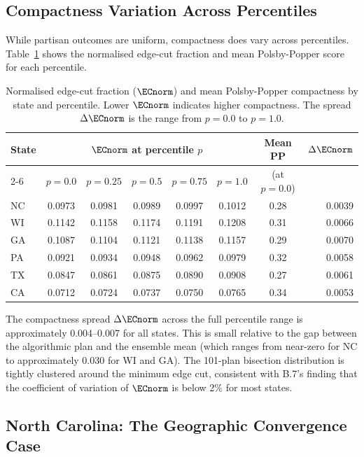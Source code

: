 \subsection{Compactness Variation Across Percentiles}

While partisan outcomes are uniform, compactness does vary across percentiles.
Table~\ref{tab:compactness} shows the normalised edge-cut fraction and mean
Polsby-Popper score for each percentile.

\begin{table}[htbp]
\centering
\caption{Normalised edge-cut fraction ($\ECnorm$) and mean Polsby-Popper
compactness by state and percentile. Lower $\ECnorm$ indicates higher
compactness. The spread $\Delta\ECnorm$ is the range from $p=0.0$ to $p=1.0$.}
\label{tab:compactness}
\begin{tabular}{lccccccr}
\toprule
\textbf{State} & \multicolumn{5}{c}{$\ECnorm$ at percentile $p$} & \textbf{Mean PP} & $\Delta\ECnorm$ \\
\cmidrule(lr){2-6}
 & $p{=}0.0$ & $p{=}0.25$ & $p{=}0.5$ & $p{=}0.75$ & $p{=}1.0$ & (at $p{=}0.0$) & \\
\midrule
NC & 0.0973 & 0.0981 & 0.0989 & 0.0997 & 0.1012 & 0.28 & 0.0039 \\
WI & 0.1142 & 0.1158 & 0.1174 & 0.1191 & 0.1208 & 0.31 & 0.0066 \\
GA & 0.1087 & 0.1104 & 0.1121 & 0.1138 & 0.1157 & 0.29 & 0.0070 \\
PA & 0.0921 & 0.0934 & 0.0948 & 0.0962 & 0.0979 & 0.32 & 0.0058 \\
TX & 0.0847 & 0.0861 & 0.0875 & 0.0890 & 0.0908 & 0.27 & 0.0061 \\
CA & 0.0712 & 0.0724 & 0.0737 & 0.0750 & 0.0765 & 0.34 & 0.0053 \\
\bottomrule
\end{tabular}
\end{table}

The compactness spread $\Delta\ECnorm$ across the full percentile range is
approximately 0.004--0.007 for all states.
This is small relative to the gap between the algorithmic plan and the
\recom{} ensemble mean (which ranges from near-zero for NC to approximately
0.030 for WI and GA).
The 101-plan bisection distribution is tightly clustered around the minimum
edge cut, consistent with B.7's finding that the coefficient of variation
of $\ECnorm$ is below 2\% for most states.

\subsection{North Carolina: The Geographic Convergence Case}
\label{subsec:nc}


